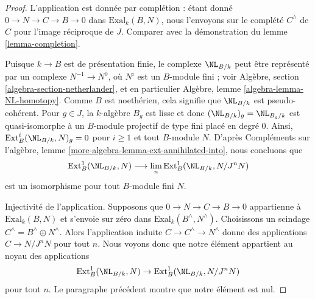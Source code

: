 \begin{proof}
L'application est donnée par complétion : étant donné $0 \to N \to C \to B \to 0$
dans $\text{Exal}_k(B, N)$, nous l'envoyons sur le complété $C^\wedge$
de $C$ pour l'image réciproque de $J$. Comparer avec
la démonstration du lemme \ref{lemma-completion}.

\medskip\noindent
Puisque $k \to B$ est de présentation finie, le complexe
$\NL_{B/k}$ peut être représenté par un complexe
$N^{-1} \to N^0$, où $N^i$ est un $B$-module fini ; voir
Algèbre, section \ref{algebra-section-netherlander}, et
en particulier
Algèbre, lemme \ref{algebra-lemma-NL-homotopy}.
Comme $B$ est noethérien, cela signifie que $\NL_{B/k}$
est pseudo-cohérent. Pour $g \in J$, la $k$-algèbre $B_g$
est lisse et donc $(\NL_{B/k})_g = \NL_{B_g/k}$
est quasi-isomorphe à un $B$-module projectif de type fini placé en degré $0$.
Ainsi, $\text{Ext}^i_B(\NL_{B/k}, N)_g = 0$ pour $i \geq 1$
et tout $B$-module $N$. D'après
Compléments sur l'algèbre, lemme \ref{more-algebra-lemma-ext-annihilated-into},
nous concluons que
$$
\text{Ext}^1_B(\NL_{B/k}, N) \longrightarrow
\lim_n \text{Ext}^1_B(\NL_{B/k}, N/J^n N)
$$
est un isomorphisme pour tout $B$-module fini $N$.

\medskip\noindent
Injectivité de l'application.
Supposons que $0 \to N \to C \to B \to 0$ appartienne à $\text{Exal}_k(B, N)$
et s'envoie sur zéro dans $\text{Exal}_k(B^\wedge, N^\wedge)$.
Choisissons un scindage $C^\wedge = B^\wedge \oplus N^\wedge$.
Alors l'application induite $C \to C^\wedge \to N^\wedge$
donne des applications $C \to N/J^nN$ pour tout $n$.
Nous voyons donc que notre élément appartient au noyau des applications
$$
\text{Ext}^1_B(\NL_{B/k}, N) \to
\text{Ext}^1_B(\NL_{B/k}, N/J^n N)
$$
pour tout $n$. Le paragraphe précédent montre que
notre élément est nul.


\end{proof}
